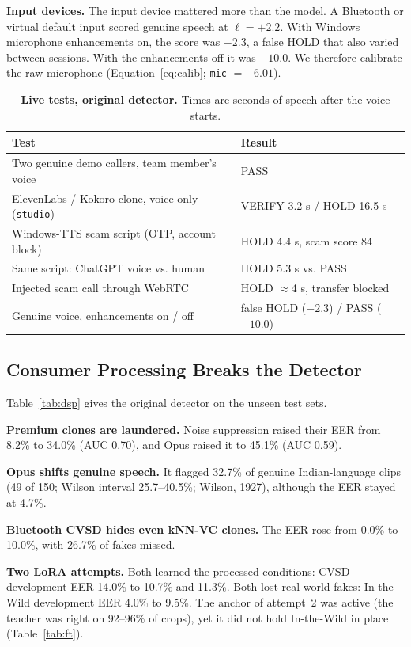 \documentclass[10pt,a4paper,twocolumn]{article}
\newcommand{\llr}{\ell}
\begin{document}
\textbf{Input devices.} The input device mattered more than the model. A Bluetooth or virtual default input scored genuine speech at $\llr=+2.2$. With Windows microphone enhancements on, the score was $-2.3$, a false HOLD that also varied between sessions. With the enhancements off it was $-10.0$. We therefore calibrate the raw microphone (Equation~\ref{eq:calib}; \texttt{mic} $=-6.01$).

\begin{table}[t]
\centering\scriptsize
\caption{\textbf{Live tests, original detector.} Times are seconds of speech after the voice starts.}
\label{tab:live}
\setlength{\tabcolsep}{3pt}
\begin{tabular}{@{}p{}p{}@{}}
\toprule
\textbf{Test} & \textbf{Result}\\
\midrule
Two genuine demo callers, team member's voice & PASS\\
ElevenLabs / Kokoro clone, voice only (\texttt{studio}) & VERIFY 3.2 s / HOLD 16.5 s\\
Windows-TTS scam script (OTP, account block) & HOLD 4.4 s, scam score 84\\
Same script: ChatGPT voice vs. human & HOLD 5.3 s vs. PASS\\
Injected scam call through WebRTC & HOLD $\approx$4 s, transfer blocked\\
Genuine voice, enhancements on / off & false HOLD ($-2.3$) / PASS ($-10.0$)\\
\bottomrule
\end{tabular}
\end{table}

\subsection{Consumer Processing Breaks the Detector}
Table~\ref{tab:dsp} gives the original detector on the unseen test sets.

\textbf{Premium clones are laundered.} Noise suppression raised their EER from 8.2\% to 34.0\% (AUC 0.70), and Opus raised it to 45.1\% (AUC 0.59).

\textbf{Opus shifts genuine speech.} It flagged 32.7\% of genuine Indian-language clips (49 of 150; Wilson interval 25.7--40.5\%; Wilson, 1927), although the EER stayed at 4.7\%.

\textbf{Bluetooth CVSD hides even kNN-VC clones.} The EER rose from 0.0\% to 10.0\%, with 26.7\% of fakes missed.

\textbf{Two LoRA attempts.} Both learned the processed conditions: CVSD development EER 14.0\% to 10.7\% and 11.3\%. Both lost real-world fakes: In-the-Wild development EER 4.0\% to 9.5\%. The anchor of attempt~2 was active (the teacher was right on 92--96\% of crops), yet it did not hold In-the-Wild in place (Table~\ref{tab:ft}).
\end{document}
